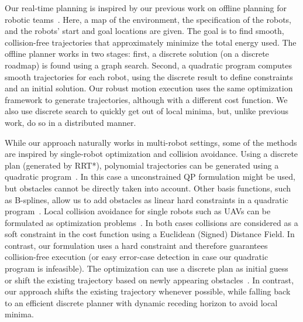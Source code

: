 \documentclass{svproc}
\begin{document}
Our real-time planning is inspired by our previous work on offline planning for robotic teams~\cite{crazyplanning-ieeetro}.
Here, a map of the environment, the specification of the robots, and the robots' start and goal locations are given.
The goal is to find smooth, collision-free trajectories that approximately minimize the total energy used.
The offline planner works in two stages: first, a discrete solution (on a discrete roadmap) is found using a graph search. Second, a quadratic program computes smooth trajectories for each robot, using the discrete result to define constraints and an initial solution.
Our robust motion execution uses the same optimization framework to generate trajectories, although with a different cost function.
We also use discrete search to quickly get out of local minima, but, unlike previous work, do so in a distributed manner.

While our approach naturally works in multi-robot settings, some of the methods are inspired by single-robot optimization and collision avoidance.
Using a discrete plan (generated by RRT*), polynomial trajectories can be generated using a quadratic program~\cite{richterISRR}.
In this case a unconstrained QP formulation might be used, but obstacles cannot be directly taken into account.
Other basis functions, such as B-splines, allow us to add obstacles as linear hard constraints in a quadratic program~\cite{flores,tang}.
Local collision avoidance for single robots such as UAVs can be formulated as optimization problems~\cite{replanning-eth,replanning-usenko}.
In both cases collisions are considered as a soft constraint in the cost function using a Euclidean (Signed) Distance Field.
In contrast, our formulation uses a hard constraint and therefore guarantees collision-free execution (or easy error-case detection in case our quadratic program is infeasible).
The optimization can use a discrete plan as initial guess~\cite{replanning-eth} or shift the existing trajectory based on newly appearing obstacles~\cite{replanning-usenko}.
In contrast, our approach shifts the existing trajectory whenever possible, while falling back to an efficient discrete planner with dynamic receding horizon to avoid local minima.





\end{document}
